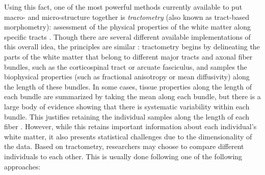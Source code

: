 Using this fact, one of the most powerful methods currently available to put
macro- and micro-structure together is \emph{tractometry} (also known as
tract-based morphometry): assessment of the physical properties of the white
matter along specific tracts \cite{Bells2011-cf}. Though there are several
different available implementations of this overall idea, the principles are
similar \cite{yeatman2012tract, Yendiki2011-ay, Wassermann2016-iv, ODonnell2009-uu}:
tractometry begins by delineating the parts of the white matter that belong to
different major tracts and axonal fiber bundles, such as the corticospinal tract
or arcuate fasciculus, and samples the biophysical properties (such as
fractional anisotropy or mean diffusivity) along the length of these bundles. In
some cases, tissue properties along the length of each bundle are summarized by
taking the mean along each bundle, but there is a large body of evidence showing
that there is systematic variability within each bundle. This justifies
retaining the individual samples along the length of each fiber
\cite{yeatman2012tract, colby2012, ODonnell2009-uu}. However, while this retains
important information about each individual's white matter, it also presents
statistical challenges due to the dimensionality of the data. Based on
tractometry, researchers may choose to compare different individuals to each
other. This is usually done following one of the following approaches:

